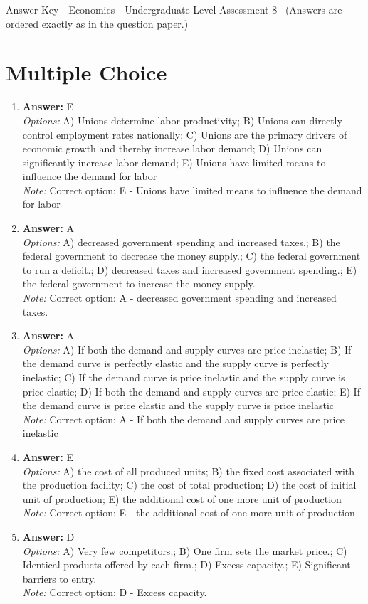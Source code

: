 \documentclass[12pt]{article}
\begin{document}
\begin{center}
Answer Key - Economics - Undergraduate Level Assessment 8 \
\small (Answers are ordered exactly as in the question paper.)
\end{center}

\section*{Multiple Choice}
\begin{enumerate}[label=\arabic*.]
\item \textbf{Answer:} E
\\ \textit{Options:} A) Unions determine labor productivity; B) Unions can directly control employment rates nationally; C) Unions are the primary drivers of economic growth and thereby increase labor demand; D) Unions can significantly increase labor demand; E) Unions have limited means to influence the demand for labor
\\ \textit{Note:} Correct option: E - Unions have limited means to influence the demand for labor
\item \textbf{Answer:} A
\\ \textit{Options:} A) decreased government spending and increased taxes.; B) the federal government to decrease the money supply.; C) the federal government to run a deficit.; D) decreased taxes and increased government spending.; E) the federal government to increase the money supply.
\\ \textit{Note:} Correct option: A - decreased government spending and increased taxes.
\item \textbf{Answer:} A
\\ \textit{Options:} A) If both the demand and supply curves are price inelastic; B) If the demand curve is perfectly elastic and the supply curve is perfectly inelastic; C) If the demand curve is price inelastic and the supply curve is price elastic; D) If both the demand and supply curves are price elastic; E) If the demand curve is price elastic and the supply curve is price inelastic
\\ \textit{Note:} Correct option: A - If both the demand and supply curves are price inelastic
\item \textbf{Answer:} E
\\ \textit{Options:} A) the cost of all produced units; B) the fixed cost associated with the production facility; C) the cost of total production; D) the cost of initial unit of production; E) the additional cost of one more unit of production
\\ \textit{Note:} Correct option: E - the additional cost of one more unit of production
\item \textbf{Answer:} D
\\ \textit{Options:} A) Very few competitors.; B) One firm sets the market price.; C) Identical products offered by each firm.; D) Excess capacity.; E) Significant barriers to entry.
\\ \textit{Note:} Correct option: D - Excess capacity.
\end{enumerate}
\end{document}
